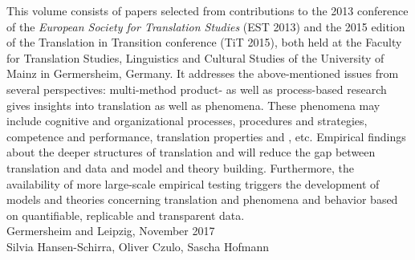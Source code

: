 \begin{refsection}
This volume consists of papers selected from contributions to the 2013 conference of the \textit{European Society for Translation Studies} (EST 2013) and the 2015 edition of the Translation in Transition conference (TiT 2015), both held at the Faculty for Translation Studies, Linguistics and Cultural Studies of the University of Mainz in Germersheim, Germany. It addresses the above-mentioned issues from several perspectives: multi-method product- as well as process-based research gives insights into translation as well as  phenomena. These phenomena may include cognitive and organizational processes, procedures and strategies, competence and performance, translation properties and , etc. Empirical findings about the deeper structures of translation and  will reduce the gap between translation and  data and model and theory building. Furthermore, the availability of more large-scale empirical testing triggers the development of models and theories concerning translation and  phenomena and behavior based on quantifiable, replicable and transparent data.\\

\bigskip{}
\noindent Germersheim and Leipzig, November 2017\\
\noindent Silvia Hansen-Schirra, Oliver Czulo, Sascha Hofmann




\end{refsection}
